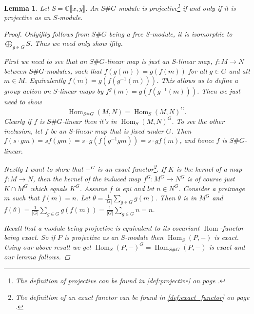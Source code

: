 \documentclass[11pt, a4paper, english]{article}
\numberwithin{prop}{section}
\newtheorem{lemma}{Lemma}
\numberwithin{lemma}{section}
\numberwithin{theorem}{section}
\numberwithin{defin}{section}
\numberwithin{example}{section}
\newcommand{\C}{\mathbb{C}}
\DeclareMathOperator{\Hom}{Hom}
\begin{document}
\begin{lemma}
\label{lem:S proj => SG proj}
Let $S = \C\llbracket x, y \rrbracket$. An $S\#G$-module is projective\footnote{The definition of projective can be found in \cref{def:projective} on page \pageref{def:projective}.} if and only if it is projective as an $S$-module.

\begin{proof}
Onlyifity follows from $S\#G$ being a free $S$-module, it is isomorphic to $\bigoplus_{g \in G} S$. Thus we need only show ifity.

First we need to see that an $S\#G$-linear map is just an $S$-linear map, $f: M \to N$ between $S\#G$-modules, such that $f(g(m))=g(f(m))$ for all $g \in G$ and all $m \in M$. Equivalently $f(m) = g(f(g^{-1}(m)))$. This allows us to define a group action on $S$-linear maps by $f^g(m) = g(f(g^{-1}(m)))$. Then we just need to show $$ \Hom_{S\#G}(M,N) = \Hom_S(M,N)^G.$$
Clearly if $f$ is $S\#G$-linear then it's in $\Hom_S(M,N)^G$. To see the other inclusion, let $f$ be an $S$-linear map that is fixed under $G$. Then $f(s\cdot g m) = s f(g m) = s\cdot g(f(g^{-1} g m)) = s \cdot g f(m) $, and hence $f$ is $S\#G$-linear. 

Nextly I want to show that $-^G$ is an exact functor\footnote{The definition of an exact functor can be found in \cref{def:exact_functor} on page \pageref{def:exact_functor}.}. If $K$ is the kernel of a map $f: M \to N$, then the kernel of the induced map $f^G : M^G \to N^G$ is of course just $K \cap M^G$ which equals $K^G$. Assume $f$ is epi and let $n \in N^G$. Consider a preimage $m$ such that $f(m)=n$. Let $\theta = \frac{1}{|G|}\sum_{g \in G} g(m)$. Then $\theta$ is in $M^G$ and $f(\theta) = \frac{1}{|G|}\sum_{g \in G} g(f(m)) = \frac{1}{|G|}\sum_{g \in G} n = n$.

Recall that a module being projective is equivalent to its covariant $\Hom$-functor being exact. So if $P$ is projective as an $S$-module then $\Hom_S(P, -)$ is exact. Using our above result we get $\Hom_S(P, -)^G = \Hom_{S\#G}(P, -)$ is exact and our lemma follows.
\end{proof}
\end{lemma}
\end{document}
